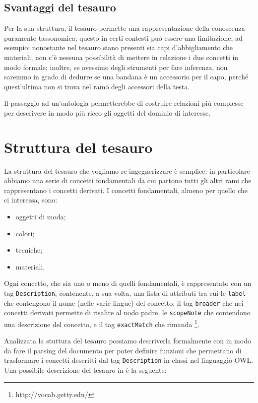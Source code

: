 \subsection{Svantaggi del tesauro}
Per la sua struttura, il tesauro permette una rappresentazione della conoscenza puramente tassonomica; questo in certi contesti può essere una limitazione, ad esempio: nonostante nel tesauro siano presenti sia capi d'abbigliamento che materiali, non c'è nessuna possibilità di mettere in relazione i due concetti in modo formale; inoltre, se avessimo degli strumenti per fare inferenza, non saremmo in grado di dedurre se una bandana è un accessorio per il capo, perché quest'ultima non si trova nel ramo degli accessori della testa.

Il passaggio ad un'ontologia permetterebbe di costruire relazioni più complesse per descrivere in modo più ricco gli oggetti del dominio di interesse.
\section{Struttura del tesauro}
La struttura del tesauro che vogliamo re-ingegnerizzare è semplice: in particolare abbiamo una serie di concetti fondamentali da cui partono tutti gli altri rami che rappresentano i concetti derivati. I concetti fondamentali, almeno per quello che ci interessa, sono:
\begin{itemize}
	\item oggetti di moda;
	\item colori;
	\item tecniche;
	\item materiali.
\end{itemize}
Ogni concetto, che sia uno o meno di quelli fondamentali, è rappresentato con un tag \verb|Description|, contenente, a sua volta, una lista di attributi tra cui le \verb|label| che contengono il nome (nelle varie lingue) del concetto, il tag \verb|broader| che nei concetti derivati permette di risalire al nodo padre, le \verb|scopeNote| che contendono una descrizione del concetto, e il tag \verb|exactMatch| che rimanda \footnote{http://vocab.getty.edu/}.

Analizzata la stuttura del tesauro possiamo descriverla formalmente con \cduce in modo da fare il parsing del documento per poter definire funzioni che permettano di trasformare i concetti descritti dal tag \verb|Description| in classi nel linguaggio OWL. Una possibile descrizione del tesauro in \cduce è la seguente:
